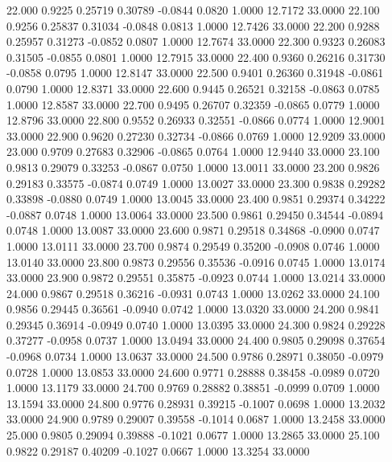   22.000   0.9225   0.25719   0.30789  -0.0844   0.0820   1.0000  12.7172  33.0000
  22.100   0.9256   0.25837   0.31034  -0.0848   0.0813   1.0000  12.7426  33.0000
  22.200   0.9288   0.25957   0.31273  -0.0852   0.0807   1.0000  12.7674  33.0000
  22.300   0.9323   0.26083   0.31505  -0.0855   0.0801   1.0000  12.7915  33.0000
  22.400   0.9360   0.26216   0.31730  -0.0858   0.0795   1.0000  12.8147  33.0000
  22.500   0.9401   0.26360   0.31948  -0.0861   0.0790   1.0000  12.8371  33.0000
  22.600   0.9445   0.26521   0.32158  -0.0863   0.0785   1.0000  12.8587  33.0000
  22.700   0.9495   0.26707   0.32359  -0.0865   0.0779   1.0000  12.8796  33.0000
  22.800   0.9552   0.26933   0.32551  -0.0866   0.0774   1.0000  12.9001  33.0000
  22.900   0.9620   0.27230   0.32734  -0.0866   0.0769   1.0000  12.9209  33.0000
  23.000   0.9709   0.27683   0.32906  -0.0865   0.0764   1.0000  12.9440  33.0000
  23.100   0.9813   0.29079   0.33253  -0.0867   0.0750   1.0000  13.0011  33.0000
  23.200   0.9826   0.29183   0.33575  -0.0874   0.0749   1.0000  13.0027  33.0000
  23.300   0.9838   0.29282   0.33898  -0.0880   0.0749   1.0000  13.0045  33.0000
  23.400   0.9851   0.29374   0.34222  -0.0887   0.0748   1.0000  13.0064  33.0000
  23.500   0.9861   0.29450   0.34544  -0.0894   0.0748   1.0000  13.0087  33.0000
  23.600   0.9871   0.29518   0.34868  -0.0900   0.0747   1.0000  13.0111  33.0000
  23.700   0.9874   0.29549   0.35200  -0.0908   0.0746   1.0000  13.0140  33.0000
  23.800   0.9873   0.29556   0.35536  -0.0916   0.0745   1.0000  13.0174  33.0000
  23.900   0.9872   0.29551   0.35875  -0.0923   0.0744   1.0000  13.0214  33.0000
  24.000   0.9867   0.29518   0.36216  -0.0931   0.0743   1.0000  13.0262  33.0000
  24.100   0.9856   0.29445   0.36561  -0.0940   0.0742   1.0000  13.0320  33.0000
  24.200   0.9841   0.29345   0.36914  -0.0949   0.0740   1.0000  13.0395  33.0000
  24.300   0.9824   0.29228   0.37277  -0.0958   0.0737   1.0000  13.0494  33.0000
  24.400   0.9805   0.29098   0.37654  -0.0968   0.0734   1.0000  13.0637  33.0000
  24.500   0.9786   0.28971   0.38050  -0.0979   0.0728   1.0000  13.0853  33.0000
  24.600   0.9771   0.28888   0.38458  -0.0989   0.0720   1.0000  13.1179  33.0000
  24.700   0.9769   0.28882   0.38851  -0.0999   0.0709   1.0000  13.1594  33.0000
  24.800   0.9776   0.28931   0.39215  -0.1007   0.0698   1.0000  13.2032  33.0000
  24.900   0.9789   0.29007   0.39558  -0.1014   0.0687   1.0000  13.2458  33.0000
  25.000   0.9805   0.29094   0.39888  -0.1021   0.0677   1.0000  13.2865  33.0000
  25.100   0.9822   0.29187   0.40209  -0.1027   0.0667   1.0000  13.3254  33.0000
